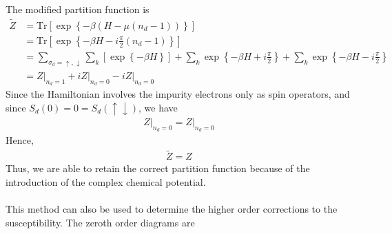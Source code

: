 \documentclass[twoside,11pt]{report}
\numberwithin{equation}{section}
\begin{document}
The modified partition function is
\begin{equation}\begin{aligned}
	\widetilde Z &= \text{Tr}\left[\exp\left\{-\beta \left(H -  \mu(n_d-1)\right)\right\}\right]\\
	      &=\text{Tr}\left[\exp\left\{-\beta H - i\frac{\pi}{2}(n_d -1)\right\}\right]\\
	      &=\sum_{\sigma_d = \uparrow,\downarrow}\sum_{k}\left[\exp\left\{-\beta H\right\}\right] + \sum_{k}\exp\left\{-\beta H + i\frac{\pi}{2}\right\} + \sum_{k}\exp\left\{-\beta H - i\frac{\pi}{2}\right\}\\
         &= Z\bigg\vert_{n_d = 1} + i Z\bigg\vert_{n_d = 0} - i Z\bigg\vert_{n_d = 0}
\end{aligned}\end{equation}
Since the Hamiltonian involves the impurity electrons only as spin operators, and since \(S_d(0) = 0 = S_d(\uparrow\downarrow)\), we have 
\begin{equation}\begin{aligned}
Z\bigg\vert_{n_d = 0} = Z\bigg\vert_{n_d = 0}
\end{aligned}\end{equation}
Hence,
\begin{equation}\begin{aligned}
\widetilde Z = Z
\end{aligned}\end{equation}
Thus, we are able to retain the correct partition function because of the introduction of the complex chemical potential.\\\\
This method can also be used to determine the higher order corrections to the susceptibility.
The zeroth order diagrams are\\\\
\end{document}
